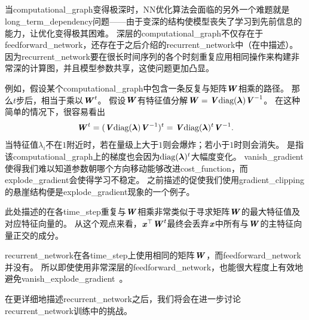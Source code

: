 \subsection{}
\label{sec:long_term_dependencies}
当\gls{computational_graph}变得极深时，\gls{NN}优化算法会面临的另外一个难题就是\gls{long_term_dependency}问题——由于变深的结构使模型丧失了学习到先前信息的能力，让优化变得极其困难。 
深层的\gls{computational_graph}不仅存在于\gls{feedforward_network}，还存在于之后介绍的\gls{recurrent_network}中（在中描述）。
因为\gls{recurrent_network}要在很长时间序列的各个时刻重复应用相同操作来构建非常深的计算图，并且模型参数共享，这使问题更加凸显。


例如，假设某个\gls{computational_graph}中包含一条反复与矩阵$\boldsymbol{\mathit{W}}$相乘的路径。
那么$t$步后，相当于乘以$\boldsymbol{\mathit{W}}^t$。
假设$\boldsymbol{\mathit{W}}$有特征值分解$\boldsymbol{\mathit{W}} = \boldsymbol{\mathit{V}} \text{diag}(\boldsymbol{\lambda}) \boldsymbol{\mathit{V}}^{-1}$。
在这种简单的情况下，很容易看出
\begin{equation}
  \boldsymbol{\mathit{W}}^t = (\boldsymbol{\mathit{V}} \text{diag}(\boldsymbol{\lambda}) \boldsymbol{\mathit{V}}^{-1})^t = \boldsymbol{\mathit{V}}\text{diag}(\boldsymbol{\lambda})^t  \boldsymbol{\mathit{V}}^{-1}.
\end{equation}
当特征值$\lambda_i$不在$1$附近时，若在量级上大于$1$则会爆炸；若小于$1$时则会消失。
是指该\gls{computational_graph}上的梯度也会因为$\text{diag}(\boldsymbol{\lambda})^t$大幅度变化。
\gls{vanish_gradient}使得我们难以知道参数朝哪个方向移动能够改进\gls{cost_function}，而\gls{explode_gradient}会使得学习不稳定。
之前描述的促使我们使用\gls{gradient_clipping}的悬崖结构便是\gls{explode_gradient}现象的一个例子。


此处描述的在各\gls{time_step}重复与$\boldsymbol{\mathit{W}}$相乘非常类似于寻求矩阵$\boldsymbol{\mathit{W}}$的最大特征值及对应特征向量的。
从这个观点来看，$\boldsymbol{\mathit{x}}^\top\boldsymbol{\mathit{W}}^t$最终会丢弃$\boldsymbol{\mathit{x}}$中所有与$\boldsymbol{\mathit{W}}$的主特征向量正交的成分。


\gls{recurrent_network}在各\gls{time_step}上使用相同的矩阵$\boldsymbol{\mathit{W}}$，而\gls{feedforward_network}并没有。
所以即使使用非常深层的\gls{feedforward_network}，也能很大程度上有效地避免\gls{vanish_explode_gradient}~\citep{Sussillo14}。


在更详细地描述\gls{recurrent_network}之后，我们将会在进一步讨论\gls{recurrent_network}训练中的挑战。


